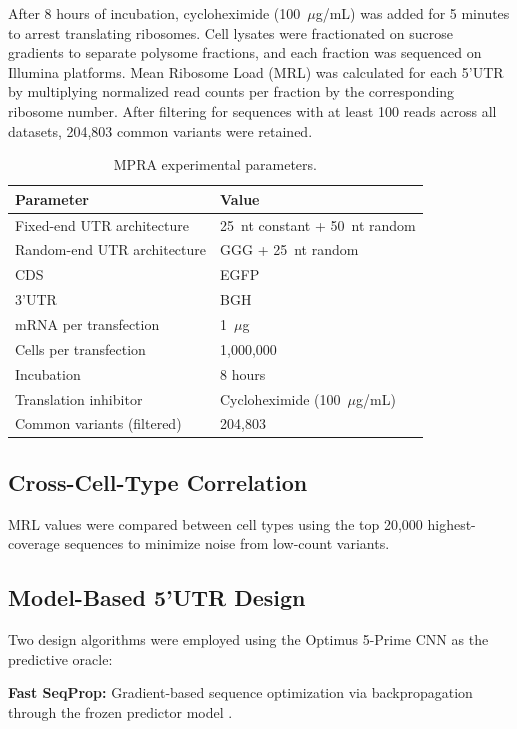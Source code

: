 \documentclass[12pt]{article}
\begin{document}
After 8 hours of incubation, cycloheximide (100~$\mu$g/mL) was added for 5 minutes to arrest translating ribosomes. Cell lysates were fractionated on sucrose gradients to separate polysome fractions, and each fraction was sequenced on Illumina platforms. Mean Ribosome Load (MRL) was calculated for each 5'UTR by multiplying normalized read counts per fraction by the corresponding ribosome number. After filtering for sequences with at least 100 reads across all datasets, 204,803 common variants were retained.

\begin{table}[ht]
\centering
\caption{MPRA experimental parameters.}
\label{tab:mpra}
\begin{tabular}{ll}
\toprule
Parameter & Value \\
\midrule
Fixed-end UTR architecture & 25~nt constant + 50~nt random \\
Random-end UTR architecture & GGG + 25~nt random \\
CDS & EGFP \\
3'UTR & BGH \\
mRNA per transfection & 1~$\mu$g \\
Cells per transfection & 1,000,000 \\
Incubation & 8 hours \\
Translation inhibitor & Cycloheximide (100~$\mu$g/mL) \\
Common variants (filtered) & 204,803 \\
\bottomrule
\end{tabular}
\end{table}

\subsection{Cross-Cell-Type Correlation}

MRL values were compared between cell types using the top 20,000 highest-coverage sequences to minimize noise from low-count variants.

\subsection{Model-Based 5'UTR Design}

Two design algorithms were employed using the Optimus 5-Prime CNN as the predictive oracle:

\textbf{Fast SeqProp:} Gradient-based sequence optimization via backpropagation through the frozen predictor model \citep{linder2020fast}.
\end{document}

